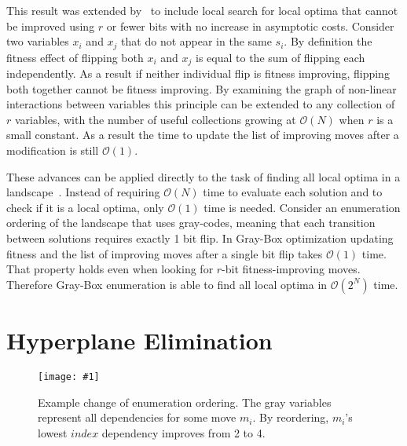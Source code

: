 \documentclass[runningheads,a4paper]{llncs}
\newcommand{\includegraphicsfit}[1]
{\texttt{[image: \#1]}}
\newcommand{\BigO}[1]{$\mathcal{O}{(#1)}$}
\begin{document}
This result was extended by~\cite{chicano:2014:ball} to include local search for local
optima that cannot be improved using $r$ or fewer bits with no increase in asymptotic costs.
Consider two variables $x_i$ and $x_j$ that do not appear in the same $s_i$.
By definition the fitness effect of flipping both $x_i$ and $x_j$ is equal to the sum
of flipping each independently. As a result if neither individual flip is fitness improving,
flipping both together cannot be fitness improving. By examining the graph of non-linear
interactions between variables this principle can be extended to any collection of $r$
variables, with the number of useful collections growing at \BigO{N} when $r$ is a small constant.
As a result the time to update the list of improving moves after a modification is still \BigO{1}.

These advances can be applied directly to the task of finding all local optima in a
landscape~\cite{ochoa:2015:crossovernetworks}.
Instead of requiring \BigO{N} time to evaluate each solution and to check if it
is a local optima, only \BigO{1} time is needed. Consider an enumeration ordering of the landscape
that uses gray-codes, meaning that each transition between solutions requires exactly 1 bit flip.
In Gray-Box optimization updating fitness and the list of improving moves after a single bit flip
takes \BigO{1} time. That property holds even when looking for $r$-bit fitness-improving moves.
Therefore Gray-Box enumeration is able to find all local optima in \BigO{2^N} time.

\section{Hyperplane Elimination}
\begin{figure*}
  \centering
  \includegraphicsfit{Enumerate}
  \caption{Example change of enumeration ordering. The gray variables represent all dependencies
           for some move $m_i$. By reordering, $m_i$'s lowest $index$ dependency improves from 2 to 4.}
  \label{fig-enumerate}
\end{figure*}
\end{document}

